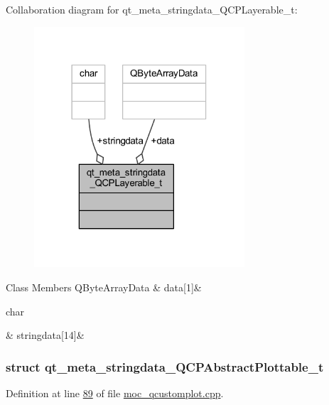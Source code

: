 Collaboration diagram for qt\+\_\+meta\+\_\+stringdata\+\_\+\+Q\+C\+P\+Layerable\+\_\+t\+:
\nopagebreak
\begin{figure}[H]
\begin{center}
\leavevmode
\includegraphics[width=222pt]{d9/d38/a00166}
\end{center}
\end{figure}
\begin{DoxyFields}{Class Members}
\hypertarget{a00016_a08a4a1de23442a83952a11d68453ab4d}{Q\+Byte\+Array\+Data}\label{a00016_a08a4a1de23442a83952a11d68453ab4d}
&
data\mbox{[}1\mbox{]}&
\\
\hline

\hypertarget{a00016_a4dff397c178a0aa24e1087e6ab89c187}{char}\label{a00016_a4dff397c178a0aa24e1087e6ab89c187}
&
stringdata\mbox{[}14\mbox{]}&
\\
\hline

\end{DoxyFields}
\label{da/d74/a00099}
\hypertarget{a00016_da/d74/a00099}{}
\subsubsection{struct qt\+\_\+meta\+\_\+stringdata\+\_\+\+Q\+C\+P\+Abstract\+Plottable\+\_\+t}


Definition at line \hyperlink{a00016_source_l00089}{89} of file \hyperlink{a00016_source}{moc\+\_\+qcustomplot.\+cpp}.



